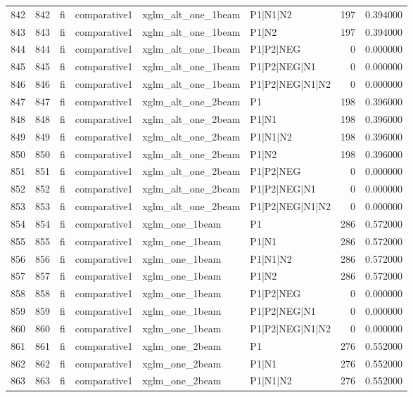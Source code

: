 \begin{tabular}{lrllllrr}
842 & 842 & fi & comparative1 & xglm_alt_one_1beam & P1|N1|N2 & 197 & 0.394000 \\
843 & 843 & fi & comparative1 & xglm_alt_one_1beam & P1|N2 & 197 & 0.394000 \\
844 & 844 & fi & comparative1 & xglm_alt_one_1beam & P1|P2|NEG & 0 & 0.000000 \\
845 & 845 & fi & comparative1 & xglm_alt_one_1beam & P1|P2|NEG|N1 & 0 & 0.000000 \\
846 & 846 & fi & comparative1 & xglm_alt_one_1beam & P1|P2|NEG|N1|N2 & 0 & 0.000000 \\
847 & 847 & fi & comparative1 & xglm_alt_one_2beam & P1 & 198 & 0.396000 \\
848 & 848 & fi & comparative1 & xglm_alt_one_2beam & P1|N1 & 198 & 0.396000 \\
849 & 849 & fi & comparative1 & xglm_alt_one_2beam & P1|N1|N2 & 198 & 0.396000 \\
850 & 850 & fi & comparative1 & xglm_alt_one_2beam & P1|N2 & 198 & 0.396000 \\
851 & 851 & fi & comparative1 & xglm_alt_one_2beam & P1|P2|NEG & 0 & 0.000000 \\
852 & 852 & fi & comparative1 & xglm_alt_one_2beam & P1|P2|NEG|N1 & 0 & 0.000000 \\
853 & 853 & fi & comparative1 & xglm_alt_one_2beam & P1|P2|NEG|N1|N2 & 0 & 0.000000 \\
854 & 854 & fi & comparative1 & xglm_one_1beam & P1 & 286 & 0.572000 \\
855 & 855 & fi & comparative1 & xglm_one_1beam & P1|N1 & 286 & 0.572000 \\
856 & 856 & fi & comparative1 & xglm_one_1beam & P1|N1|N2 & 286 & 0.572000 \\
857 & 857 & fi & comparative1 & xglm_one_1beam & P1|N2 & 286 & 0.572000 \\
858 & 858 & fi & comparative1 & xglm_one_1beam & P1|P2|NEG & 0 & 0.000000 \\
859 & 859 & fi & comparative1 & xglm_one_1beam & P1|P2|NEG|N1 & 0 & 0.000000 \\
860 & 860 & fi & comparative1 & xglm_one_1beam & P1|P2|NEG|N1|N2 & 0 & 0.000000 \\
861 & 861 & fi & comparative1 & xglm_one_2beam & P1 & 276 & 0.552000 \\
862 & 862 & fi & comparative1 & xglm_one_2beam & P1|N1 & 276 & 0.552000 \\
863 & 863 & fi & comparative1 & xglm_one_2beam & P1|N1|N2 & 276 & 0.552000 \\

\end{tabular}
